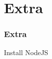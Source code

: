 \section{Extra}

\frame{\tableofcontents[currentsection]}

\begin{frame}
    \frametitle{Extra}

    Install NodeJS

\end{frame}
